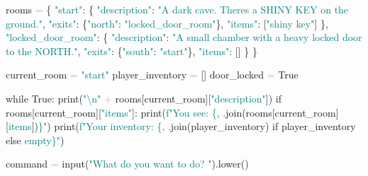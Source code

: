 \documentclass[
  justified,
  openright,
]{tufte-book}
\newcommand{\BuiltInTok}[1]{#1}
\newcommand{\CharTok}[1]{\textcolor{Teal}{#1}}
\newcommand{\ControlFlowTok}[1]{\textcolor{BrandBlue}{#1}}
\newcommand{\NormalTok}[1]{#1}
\newcommand{\OperatorTok}[1]{\textcolor{DarkGray}{#1}}
\newcommand{\SpecialCharTok}[1]{\textcolor{Teal}{#1}}
\newcommand{\SpecialStringTok}[1]{\textcolor{Teal}{#1}}
\newcommand{\StringTok}[1]{\textcolor{Teal}{#1}}
\newcommand{\VariableTok}[1]{#1}
\newenvironment{Shaded}{%
  \begin{snugshade}
}{%
  \end{snugshade}
}
\begin{document}
\begin{Shaded}
\begin{Highlighting}[]
\NormalTok{rooms }\OperatorTok{=}\NormalTok{ \{}
    \StringTok{"start"}\NormalTok{: \{}
        \StringTok{"description"}\NormalTok{: }\StringTok{"A dark cave. There\textquotesingle{}s a SHINY KEY on the ground."}\NormalTok{,}
        \StringTok{"exits"}\NormalTok{: \{}\StringTok{"north"}\NormalTok{: }\StringTok{"locked\_door\_room"}\NormalTok{\},}
        \StringTok{"items"}\NormalTok{: [}\StringTok{"shiny key"}\NormalTok{]}
\NormalTok{    \},}
    \StringTok{"locked\_door\_room"}\NormalTok{: \{}
        \StringTok{"description"}\NormalTok{: }\StringTok{"A small chamber with a heavy locked door to the NORTH."}\NormalTok{,}
        \StringTok{"exits"}\NormalTok{: \{}\StringTok{"south"}\NormalTok{: }\StringTok{"start"}\NormalTok{\},}
        \StringTok{"items"}\NormalTok{: []}
\NormalTok{    \}}
\NormalTok{\}}

\NormalTok{current\_room }\OperatorTok{=} \StringTok{"start"}
\NormalTok{player\_inventory }\OperatorTok{=}\NormalTok{ []}
\NormalTok{door\_locked }\OperatorTok{=} \VariableTok{True}

\ControlFlowTok{while} \VariableTok{True}\NormalTok{:}
    \BuiltInTok{print}\NormalTok{(}\StringTok{"}\CharTok{\textbackslash{}n}\StringTok{"} \OperatorTok{+}\NormalTok{ rooms[current\_room][}\StringTok{"description"}\NormalTok{])}
    \ControlFlowTok{if}\NormalTok{ rooms[current\_room][}\StringTok{"items"}\NormalTok{]:}
        \BuiltInTok{print}\NormalTok{(}\SpecialStringTok{f"You see: }\SpecialCharTok{\{}\StringTok{\textquotesingle{}, \textquotesingle{}}\SpecialCharTok{.}\NormalTok{join(rooms[current\_room][}\StringTok{\textquotesingle{}items\textquotesingle{}}\NormalTok{])}\SpecialCharTok{\}}\SpecialStringTok{"}\NormalTok{)}
    \BuiltInTok{print}\NormalTok{(}\SpecialStringTok{f"Your inventory: }\SpecialCharTok{\{}\StringTok{\textquotesingle{}, \textquotesingle{}}\SpecialCharTok{.}\NormalTok{join(player\_inventory) }\ControlFlowTok{if}\NormalTok{ player\_inventory }\ControlFlowTok{else} \StringTok{\textquotesingle{}empty\textquotesingle{}}\SpecialCharTok{\}}\SpecialStringTok{"}\NormalTok{)}

\NormalTok{    command }\OperatorTok{=} \BuiltInTok{input}\NormalTok{(}\StringTok{"What do you want to do? "}\NormalTok{).lower()}


\end{Highlighting}
\end{Shaded}
\end{document}
